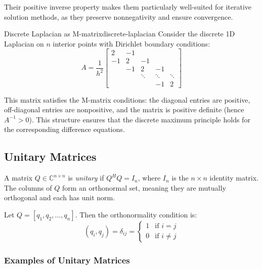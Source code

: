 \documentclass[../../main.tex]{subfiles}
\begin{document}
Their positive inverse property makes them particularly well-suited for iterative solution methods, as they preserve nonnegativity and ensure convergence.

\begin{example}{Discrete Laplacian as M-matrix}{discrete-laplacian}
    Consider the discrete 1D Laplacian on $n$ interior points with Dirichlet boundary conditions:
    \[
        A = \frac{1}{h^2} \begin{bmatrix}
            2  & -1 &        &        &        \\
            -1 & 2  & -1     &        &        \\
               & -1 & 2      & -1     &        \\
               &    & \ddots & \ddots & \ddots \\
               &    &        & -1     & 2
        \end{bmatrix}
    \]

    This matrix satisfies the M-matrix conditions: the diagonal entries are positive, off-diagonal entries are nonpositive, and the matrix is positive definite (hence $A^{-1} > 0$). This structure ensures that the discrete maximum principle holds for the corresponding difference equations.
\end{example}


\subsection{Unitary Matrices}

A matrix $Q \in \mathbb{C}^{n \times n}$ is \emph{unitary} if $Q^H Q = I_n$, where $I_n$ is the $n \times n$ identity matrix. The columns of $Q$ form an orthonormal set, meaning they are mutually orthogonal and each has unit norm.

Let $Q = [q_1, q_2, \ldots, q_n]$. Then the orthonormality condition is:
\begin{equation}
    (q_i, q_j) = \delta_{ij} = \begin{cases}
        1 & \text{if } i = j    \\
        0 & \text{if } i \neq j
    \end{cases}
\end{equation}

\subsubsection{Examples of Unitary Matrices}
\end{document}
